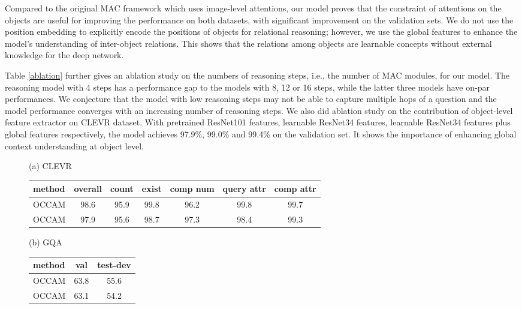 \documentclass[10pt,twocolumn,letterpaper]{article}
\begin{document}
Compared to the original MAC \cite{hudson2018compositional} framework which uses image-level attentions, our model proves that the constraint of attentions on the objects are useful for improving the performance on both datasets, with significant improvement on the validation sets. We do not use the position embedding to explicitly encode the positions of objects for relational reasoning; however, we use the global features to enhance the model's understanding of inter-object relations. This shows that the relations among objects are learnable concepts without external knowledge for the deep network. 

Table \ref{ablation} further gives an ablation study on the numbers of reasoning steps, i.e., the number of MAC modules, for our model. The reasoning model with 4 steps has a performance gap to the models with 8, 12 or 16 steps, while the latter three models have on-par performances. We conjecture that the model with low reasoning steps may not be able to capture multiple hops of a question and the model performance converges with an increasing number of reasoning steps. We also did ablation study on the contribution of object-level feature extractor on CLEVR dataset. With pretrained ResNet101 features, learnable ResNet34 features, learnable ResNet34 features plus global features respectively, the model achieves 97.9\%, 99.0\% and 99.4\% on the validation set. It shows the importance of enhancing global context understanding at object level.


\begin{figure*}
\vspace{-2mm}
\label{obj_conc_comp}
\begin{minipage}[b]{0.67\textwidth}
\small
\centering
(a) CLEVR
\begin{tabular}{l|c|ccccc}
        \toprule
         method & overall & count & exist & comp num & query attr & comp attr  \\
         \midrule
         OCCAM& 98.6 & 95.9 & 99.8 & 96.2 & 99.8 & 99.7 \\
         
         OCCAM & 97.9&95.6&98.7&97.3&98.4&99.3\\
         \bottomrule
    \end{tabular}
  \end{minipage}
  \begin{minipage}[b]{0.3\textwidth}
  \small
    \centering
    (b) GQA
    \begin{tabular}{l|c|c}
        \toprule
         method & val & test-dev  \\
         \midrule
         OCCAM & 63.8 & 55.6 \\
         OCCAM & 63.1 & 54.2\\
         \bottomrule
    \end{tabular}
    \end{minipage}
    \vspace{-3mm}
  \end{figure*}
\end{document}
